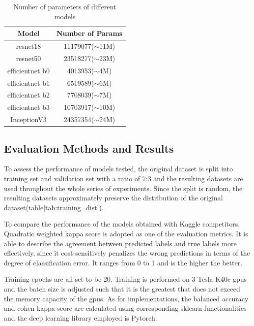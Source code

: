 \documentclass[../main.tex]{subfiles}
\begin{document}
\begin{table}[htbp]
\linespread{1.5}
\renewcommand\arraystretch{1.25}
\centering
\begin{tabular}{|c|c|}
  \hline
    Model & Number of Params \\
  \hline
    resnet18 & 11179077($\sim$11M)\\
    \hline
    resnet50 & 23518277($\sim$23M)\\
    \hline
    efficientnet b0 & 4013953($\sim$4M)\\
    \hline
    efficientnet b1 & 6519589($\sim$6M)\\
    \hline
    efficientnet b2 & 7708039($\sim$7M)\\
    \hline
    efficientnet b3 &10703917($\sim$10M) \\
    \hline
    InceptionV3 & 24357354($\sim$24M) \\
    \hline
\end{tabular}
\caption{Number of parameters of different models}
\label{tab:num_parameters}   
\end{table}
    

\subsection{Evaluation Methods and Results}
To assess the performance of models tested, the original dataset is split into training set and validation set with a ratio of 7:3 and the resulting datasets are used throughout the whole series of experiments. Since the split is random, the resulting datasets approximately preserve the distribution of the original dataset(table\ref{tab:training_dist}). 

To compare the performance of the models obtained with Kaggle competitors, Quadratic weighted kappa score is adopted as one of the evaluation metrics. It is able to describe the agreement between predicted labels and true labels more effectively, since it cost-sensitively penalizes the wrong predictions in terms of the degree of classification error. It ranges from 0 to 1 and is the higher the better. 

Training epochs are all set to be 20. Training is performed on 3 Tesla K40c gpus and the batch size is adjusted such that it is the greatest that does not exceed the memory capacity of the gpus. As for implementations, the balanced accuracy and cohen kappa score are calculated using corresponding sklearn functionalities and the deep learning library employed is Pytorch. 
\end{document}
